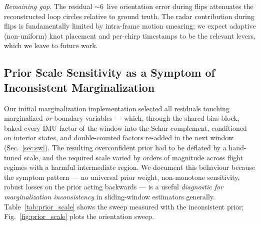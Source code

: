 \documentclass[journal]{IEEEtran}
\begin{document}
\emph{Remaining gap.}
The residual $\sim$6\degree\ live orientation error during flips
attenuates the reconstructed loop circles relative to ground truth.
The radar contribution during flips is fundamentally limited by
intra-frame motion smearing; we expect adaptive (non-uniform) knot
placement and per-chirp timestamps to be the relevant levers, which
we leave to future work.


\subsection{Prior Scale Sensitivity as a Symptom of Inconsistent
Marginalization}
\label{sec:prior_scale}

Our initial marginalization implementation selected all residuals
touching marginalized \emph{or} boundary variables --- which, through
the shared bias block, baked every IMU factor of the window into the
Schur complement, conditioned on interior states, and double-counted
factors re-added in the next window (Sec.~\ref{sec:sw}).  The
resulting overconfident prior had to be deflated by a hand-tuned
scale, and the required scale varied by orders of magnitude across
flight regimes with a harmful intermediate region.  We document this
behaviour because the symptom pattern --- no universal prior weight,
non-monotone sensitivity, robust losses on the prior acting backwards
--- is a useful \emph{diagnostic for marginalization inconsistency} in
sliding-window estimators generally.
Table~\ref{tab:prior_scale} shows the sweep measured with the
inconsistent prior; Fig.~\ref{fig:prior_scale}
plots the orientation sweep.
\end{document}
